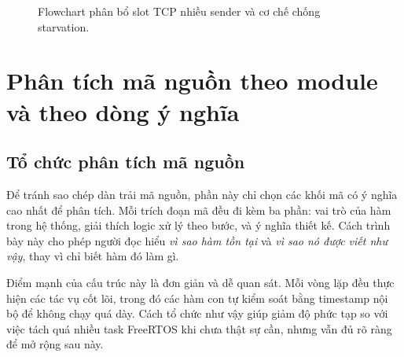 \documentclass[12pt,a4paper]{report}
\begin{document}
\begin{figure}[H]
\centering
{}
\caption{Flowchart phân bổ slot TCP nhiều sender và cơ chế chống starvation.}
\label{fig:todo-slot-fairness}
\end{figure}

\section{Phân tích mã nguồn theo module và theo dòng ý nghĩa}

\subsection{Tổ chức phân tích mã nguồn}
Để tránh sao chép dàn trải mã nguồn, phần này chỉ chọn các khối mã có ý nghĩa cao nhất để phân tích. Mỗi trích đoạn mã đều đi kèm ba phần: vai trò của hàm trong hệ thống, giải thích logic xử lý theo bước, và ý nghĩa thiết kế. Cách trình bày này cho phép người đọc hiểu \textit{vì sao hàm tồn tại} và \textit{vì sao nó được viết như vậy}, thay vì chỉ biết hàm đó làm gì.

    Điểm mạnh của cấu trúc này là đơn giản và dễ quan sát. Mỗi vòng lặp đều thực hiện các tác vụ cốt lõi, trong đó các hàm con tự kiểm soát bằng timestamp nội bộ để không chạy quá dày. Cách tổ chức như vậy giúp giảm độ phức tạp so với việc tách quá nhiều task FreeRTOS khi chưa thật sự cần, nhưng vẫn đủ rõ ràng để mở rộng sau này.
\end{document}
